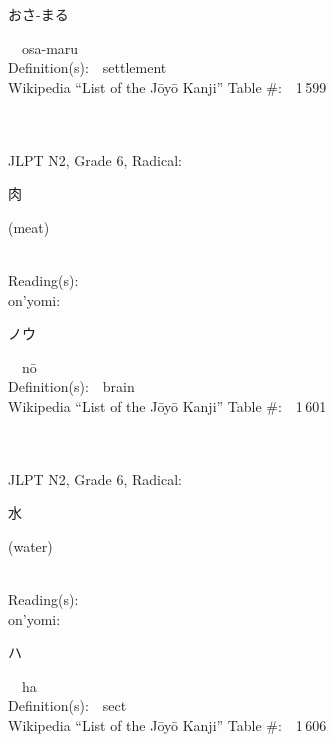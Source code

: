 \begin{multicols}{2}
{\hspace*{2em}}{\begin{CJK}{UTF8}{min} おさ-まる \end{CJK}}\ \ osa-maru\ \ \\
Definition(s):\ \ settlement \\
Wikipedia ``List of the J\=oy\=o Kanji'' Table \#:\ \ 1\,599 \\
\ \ \\
{\fontsize{34pt}{40pt}  }\ \ \\  %
{JLPT N2, Grade 6, Radical:\ \ {\begin{CJK}{UTF8}{min} 肉 \end{CJK}} (meat) } \\
Reading(s):\ \ \\
{\hspace*{1em}}on'yomi:\ \ \\
{\hspace*{2em}}{\begin{CJK}{UTF8}{min} ノウ \end{CJK}}\ \ n\=o\ \ \\
Definition(s):\ \ brain \\
Wikipedia ``List of the J\=oy\=o Kanji'' Table \#:\ \ 1\,601 \\
\ \ \\
{\fontsize{34pt}{40pt}  }\ \ \\  %
{JLPT N2, Grade 6, Radical:\ \ {\begin{CJK}{UTF8}{min} 水 \end{CJK}} (water) } \\
Reading(s):\ \ \\
{\hspace*{1em}}on'yomi:\ \ \\
{\hspace*{2em}}{\begin{CJK}{UTF8}{min} ハ \end{CJK}}\ \ ha\ \ \\
Definition(s):\ \ sect \\
Wikipedia ``List of the J\=oy\=o Kanji'' Table \#:\ \ 1\,606 \\
\ \ \\

\end{multicols}
